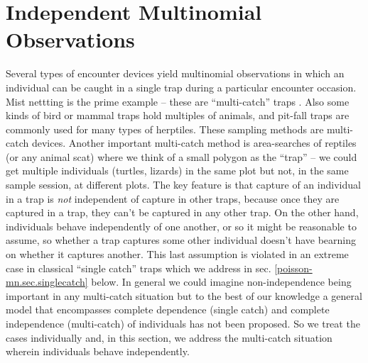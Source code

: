\section{Independent Multinomial Observations}

Several types of encounter devices yield multinomial observations in
which an individual can be caught in a single trap during a particular
encounter occasion.  Mist nettting is the prime example -- these are
``multi-catch'' traps \citep{efford_etal:2009euring}. Also some kinds of
bird or mammal traps hold multiples of animals,
and pit-fall traps are commonly used for many types of
herptiles. These sampling methods are multi-catch devices.
Another important multi-catch method is area-searches of reptiles (or
any animal scat) where we think of
a small polygon as the ``trap'' -- we could get multiple individuals
(turtles, lizards) in the same plot but not, in the same sample
session, at different plots.  The key feature is that capture of an
individual in a trap is {\it not} independent of capture in other
traps, because once they are captured in a trap,
they can't be captured in any other trap.
On the
other hand, individuals behave independently of one another, or so it
might be reasonable to assume, so whether a trap captures some other
individual doesn't have bearning on whether it captures another.  This
last assumption is violated in an extreme case in classical ``single
catch'' traps which we address in sec. \ref{poisson-mn.sec.singlecatch}
below. In general we could imagine non-independence being important in
any multi-catch situation but to the best of our knowledge a general
model that encompasses complete dependence (single catch) and complete
independence (multi-catch) of individuals has not been proposed.  So
we treat the cases individually and, in this section, we address the
multi-catch situation wherein individuals behave independently.


